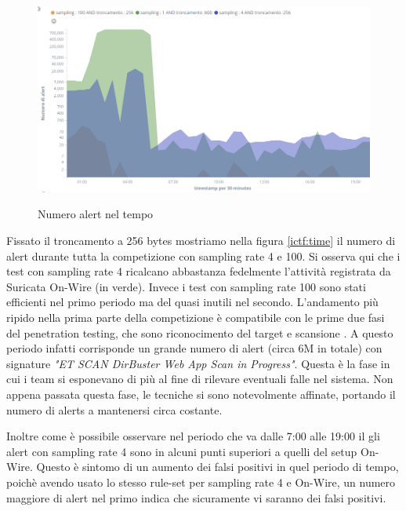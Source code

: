 \documentclass[12pt,a4paper,openright,twoside]{report}
\begin{document}
\begin{figure}[h!]
\begin{center}                          %
  \includegraphics[width=\textwidth]{images/ICTF-time-alerts.png}
  \caption[ICtF2010 - numero di alert nel tempo]{Numero alert nel tempo}\label{ictf:time}
  \label{}
\end{center}
\end{figure}

Fissato il troncamento a 256 bytes mostriamo nella figura \ref{ictf:time} il numero di alert durante tutta la
competizione con sampling rate 4 e 100. Si osserva qui che i test con sampling rate 4
ricalcano abbastanza fedelmente l'attivit\`a registrata da Suricata On-Wire (in verde).
Invece i test con sampling rate 100 sono stati efficienti nel primo periodo ma del
quasi inutili nel secondo. L'andamento pi\`u ripido nella prima parte della competizione \`e
compatibile con le prime due fasi del penetration testing, che sono riconocimento del target
e scansione \cite{EXP16}. A questo periodo infatti corrisponde un grande numero di alert (circa 6M in totale)
con signature {\it "ET SCAN DirBuster Web App Scan in Progress"}. Questa \`e la fase in cui
i team si esponevano di pi\`u al fine di rilevare eventuali falle nel sistema. Non appena passata
questa fase, le tecniche si sono notevolmente affinate, portando il numero di alerts a  mantenersi circa costante.

Inoltre come \`e possibile osservare nel periodo che va dalle 7:00 alle 19:00 il gli alert
con sampling rate 4 sono in alcuni punti superiori a quelli del setup On-Wire. Questo
\`e sintomo di un aumento dei falsi positivi in quel periodo di tempo, poich\`e avendo usato
lo stesso rule-set per sampling rate 4 e On-Wire, un numero maggiore di alert nel primo
indica che sicuramente vi saranno dei falsi positivi.
\end{document}

